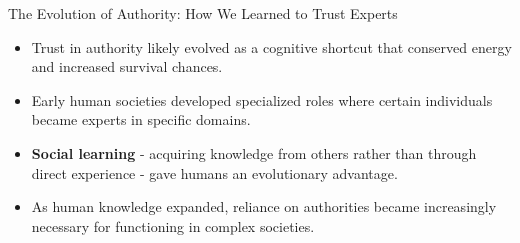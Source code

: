 \documentclass{beamer}
\begin{document}
\begin{frame}{The Evolution of Authority: How We Learned to Trust Experts}
    \begin{itemize}
        \item Trust in authority likely evolved as a cognitive shortcut that conserved energy and increased survival chances.
        \item Early human societies developed specialized roles where certain individuals became experts in specific domains.
        \item \textbf{Social learning} - acquiring knowledge from others rather than through direct experience - gave humans an evolutionary advantage.
        \item As human knowledge expanded, reliance on authorities became increasingly necessary for functioning in complex societies.
    \end{itemize}
    
\end{frame}
\end{document}
